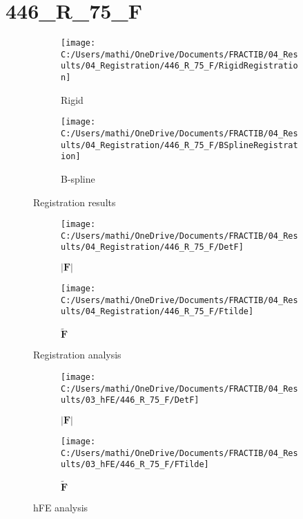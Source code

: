 \documentclass{article}%
\begin{document}
%
\newpage%
\section*{446\_R\_75\_F}%
\label{sec:446R75F}%


\begin{figure}[h!]%
\begin{subfigure}[b]{0.5\linewidth}%
\texttt{[image: C:/Users/mathi/OneDrive/Documents/FRACTIB/04\_Results/04\_Registration/446\_R\_75\_F/RigidRegistration]}%
\caption{Rigid}%
\end{subfigure}%
\begin{subfigure}[b]{0.5\linewidth}%
\texttt{[image: C:/Users/mathi/OneDrive/Documents/FRACTIB/04\_Results/04\_Registration/446\_R\_75\_F/BSplineRegistration]}%
\caption{B{-}spline}%
\end{subfigure}%
\caption{Registration results}%
\end{figure}

%


\begin{figure}[h!]%
\begin{subfigure}[b]{0.5\linewidth}%
\texttt{[image: C:/Users/mathi/OneDrive/Documents/FRACTIB/04\_Results/04\_Registration/446\_R\_75\_F/DetF]}%
\caption{$|\mathbf{F}|$}%
\end{subfigure}%
\begin{subfigure}[b]{0.5\linewidth}%
\texttt{[image: C:/Users/mathi/OneDrive/Documents/FRACTIB/04\_Results/04\_Registration/446\_R\_75\_F/Ftilde]}%
\caption{$\tilde{\mathbf{F}}$}%
\end{subfigure}%
\caption{Registration analysis}%
\end{figure}

%


\begin{figure}[h!]%
\begin{subfigure}[b]{0.5\linewidth}%
\texttt{[image: C:/Users/mathi/OneDrive/Documents/FRACTIB/04\_Results/03\_hFE/446\_R\_75\_F/DetF]}%
\caption{$|\mathbf{F}|$}%
\end{subfigure}%
\begin{subfigure}[b]{0.5\linewidth}%
\texttt{[image: C:/Users/mathi/OneDrive/Documents/FRACTIB/04\_Results/03\_hFE/446\_R\_75\_F/FTilde]}%
\caption{$\tilde{\mathbf{F}}$}%
\end{subfigure}%
\caption{hFE analysis}%
\end{figure}
\end{document}
